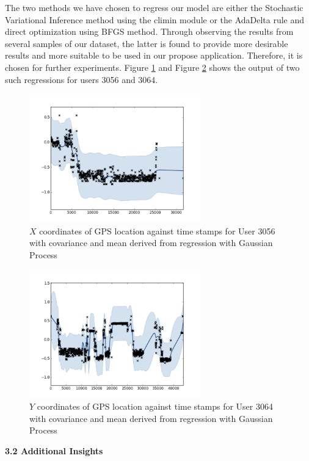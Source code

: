 \documentclass[letterpaper]{article}
\begin{document}
The two methods we have chosen to regress our model are either the Stochastic Variational Inference method using the climin module or the AdaDelta rule and direct optimization using BFGS method. Through observing the results from several samples of our dataset, the latter is found to provide more desirable results and more suitable to be used in our propose application. Therefore, it is chosen for further experiments. Figure \ref{fig:GP1} and Figure \ref{fig:GP2} shows the output of two such regressions for users 3056 and 3064. \\

\begin{figure}[h!]
  \centering
    \includegraphics[width=280px,natwidth=634,natheight=442]{selected_GP/3056.csv_X.png}
  \caption{$X$ coordinates of GPS location against time stamps for User 3056 with covariance and mean derived from regression with Gaussian Process}
  \label{fig:GP1}
\end{figure}

\begin{figure}[h!]
  \centering
    \includegraphics[width=280px,natwidth=634,natheight=442]{selected_GP/3064.csv_Y.png}
  \caption{$Y$ coordinates of GPS location against time stamps for User 3064 with covariance and mean derived from regression with Gaussian Process}
  \label{fig:GP2}
\end{figure}

{\bf3.2  Additional Insights} \\
\end{document}
